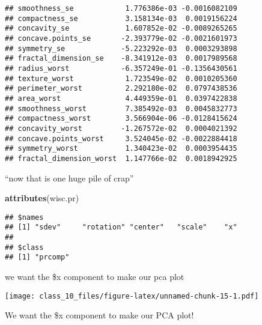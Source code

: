 \documentclass[
]{article}
\newenvironment{Shaded}{\begin{snugshade}}{\end{snugshade}}
\newcommand{\DataTypeTok}[1]{\textcolor[rgb]{0.13,0.29,0.53}{#1}}
\newcommand{\DecValTok}[1]{\textcolor[rgb]{0.00,0.00,0.81}{#1}}
\newcommand{\KeywordTok}[1]{\textcolor[rgb]{0.13,0.29,0.53}{\textbf{#1}}}
\newcommand{\NormalTok}[1]{#1}
\newcommand{\OperatorTok}[1]{\textcolor[rgb]{0.81,0.36,0.00}{\textbf{#1}}}
\begin{document}
\begin{verbatim}
## smoothness_se            1.776386e-03 -0.0016082109
## compactness_se           3.158134e-03  0.0019156224
## concavity_se             1.607852e-02 -0.0089265265
## concave.points_se       -2.393779e-02 -0.0021601973
## symmetry_se             -5.223292e-03  0.0003293898
## fractal_dimension_se    -8.341912e-03  0.0017989568
## radius_worst            -6.357249e-01 -0.1356430561
## texture_worst            1.723549e-02  0.0010205360
## perimeter_worst          2.292180e-02  0.0797438536
## area_worst               4.449359e-01  0.0397422838
## smoothness_worst         7.385492e-03  0.0045832773
## compactness_worst        3.566904e-06 -0.0128415624
## concavity_worst         -1.267572e-02  0.0004021392
## concave.points_worst     3.524045e-02 -0.0022884418
## symmetry_worst           1.340423e-02  0.0003954435
## fractal_dimension_worst  1.147766e-02  0.0018942925
\end{verbatim}

``now that is one huge pile of crap''

\begin{Shaded}
\begin{Highlighting}[]
\KeywordTok{attributes}\NormalTok{(wisc.pr)}
\end{Highlighting}
\end{Shaded}

\begin{verbatim}
## $names
## [1] "sdev"     "rotation" "center"   "scale"    "x"       
## 
## $class
## [1] "prcomp"
\end{verbatim}

we want the \$x component to make our pca plot

\begin{Shaded}
\end{Shaded}

\texttt{[image: class\_10\_files/figure-latex/unnamed-chunk-15-1.pdf]}

We want the \$x component to make our PCA plot!

\begin{Shaded}
\end{Shaded}
\end{document}
